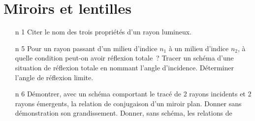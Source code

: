 \documentclass[a4paper, 10pt, final, garamond]{book}
\begin{document}
\setcounter{chapter}{0}


\chapter{Miroirs et lentilles}

\begin{enumerate}[label=\sqenumi, leftmargin=10pt]
	\item[n]{1}%
	Citer le nom des trois propriétés d'un rayon lumineux.
	\smallbreak
	\item[n]{5} %
	Pour un rayon passant d'un milieu d'indice $n_1$ à un milieu d'indice $n_2$, à
	quelle condition peut-on avoir réflexion totale~? Tracer un schéma d'une
	situation de réflexion totale en nommant l'angle d'incidence. Déterminer
	l'angle de réflexion limite.
	\smallbreak
	\noindent
	\begin{isd}[righthand ratio=.3]
		\vspace*{-20pt}
		\tcblower
		\vspace{-15pt}
		\begin{center}
		\end{center}
	\end{isd}
	\item[n]{6} %
	Démontrer, avec un schéma comportant le tracé de 2 rayons incidents et 2
	rayons émergents, la relation de conjugaison d'un miroir plan. Donner sans
	démonstration son grandissement. Donner, sans schéma, les relations de

\end{enumerate}
\end{document}
